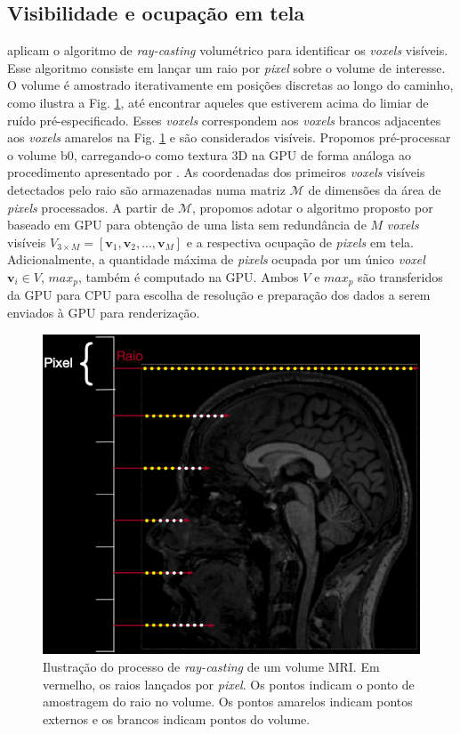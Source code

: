 \subsection{Visibilidade e ocupação em tela}
\label{ssec:visibilidade}

  aplicam o algoritmo de \textit{ray-casting} volumétrico para identificar os \textit{voxels} visíveis. Esse algoritmo consiste em lançar um raio por \textit{pixel} sobre o volume de interesse. O volume é amostrado iterativamente em posições discretas ao longo do caminho, como ilustra a Fig. \ref{fig::raycasting_2d}, até encontrar aqueles que estiverem acima do limiar de ruído pré-especificado. Esses \textit{voxels} correspondem aos \textit{voxels} brancos adjacentes aos \textit{voxels} amarelos na Fig. \ref{fig::raycasting_2d} e são considerados visíveis. Propomos pré-processar o volume b0, carregando-o como textura 3D na GPU de forma análoga ao procedimento apresentado por . As coordenadas dos primeiros \textit{voxels} visíveis detectados pelo raio são armazenadas numa matriz $\mathscr{M}$ de dimensões da área de \textit{pixels} processados. A partir de $\mathscr{M}$, propomos adotar o algoritmo proposto por  baseado em GPU para obtenção de uma lista sem redundância de $M$ \textit{voxels} visíveis $V_{3 \times M} = [
\mathbf{v}_1,
\mathbf{v}_2, ..., 
\mathbf{v}_M
]$ e a respectiva ocupação de \textit{pixels} em tela. Adicionalmente, a quantidade máxima de \textit{pixels} ocupada por um único \textit{voxel} $\mathbf{v}_i \in V$, $max_p$, também é computado na GPU. Ambos $V$ e $max_p$ são transferidos da GPU para CPU para escolha de resolução e preparação dos dados a serem enviados à GPU para renderização.

 
 \begin{figure}[ht]
    \centering
    \includegraphics[width=.55\linewidth, angle=0]{figs/Esquema_Glifo/raycasting/raycasting_2d_2.png}
    \caption{Ilustração do processo de \textit{ray-casting} de um volume MRI. Em vermelho, os raios lançados por \textit{pixel}. Os pontos indicam o ponto de amostragem do raio no volume. Os pontos amarelos indicam pontos externos e os brancos indicam pontos do volume.
     }
     \label{fig::raycasting_2d}
\end{figure}


